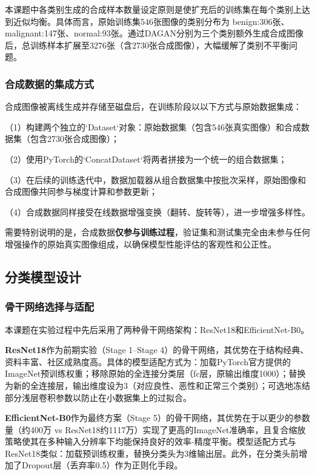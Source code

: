 本课题中各类别生成的合成样本数量设定原则是使扩充后的训练集在每个类别上达到近似均衡。具体而言，原始训练集546张图像的类别分布为 benign:306张、malignant:147张、normal:93张。通过DAGAN分别为三个类别额外生成合成图像后，总训练样本扩展至3276张（含2730张合成图像），大幅缓解了类别不平衡问题。

\subsubsection{合成数据的集成方式}

合成图像被离线生成并存储至磁盘后，在训练阶段以以下方式与原始数据集成：

（1）构建两个独立的`Dataset`对象：原始数据集（包含546张真实图像）和合成数据集（包含2730张合成图像）；

（2）使用PyTorch的`ConcatDataset`将两者拼接为一个统一的组合数据集；

（3）在后续的训练迭代中，数据加载器从组合数据集中按批次采样，原始图像和合成图像共同参与梯度计算和参数更新；

（4）合成数据同样接受在线数据增强变换（翻转、旋转等），进一步增强多样性。

需要特别说明的是，合成数据\textbf{仅参与训练过程}，验证集和测试集完全由未参与任何增强操作的原始真实图像组成，以确保模型性能评估的客观性和公正性。


\subsection{分类模型设计}

\subsubsection{骨干网络选择与适配}

本课题在实验过程中先后采用了两种骨干网络架构：ResNet18和EfficientNet-B0。

\textbf{ResNet18}作为前期实验（Stage 1--Stage 4）的骨干网络，其优势在于结构经典、资料丰富、社区成熟度高。具体的模型适配方式为：加载PyTorch官方提供的ImageNet预训练权重；移除原始的全连接分类层（fc层，原输出维度1000）；替换为新的全连接层，输出维度设为3（对应良性、恶性和正常三个类别）；可选地冻结部分浅层卷积参数以防止在小数据集上的过拟合。

\textbf{EfficientNet-B0}作为最终方案（Stage 5）的骨干网络，其优势在于以更少的参数量（约400万 vs ResNet18约1117万）实现了更高的ImageNet准确率，且复合缩放策略使其在多种输入分辨率下均能保持良好的效率-精度平衡。模型适配方式与ResNet18类似：加载预训练权重，替换分类头为3维输出层。此外，在分类头前增加了Dropout层（丢弃率0.5）作为正则化手段。

